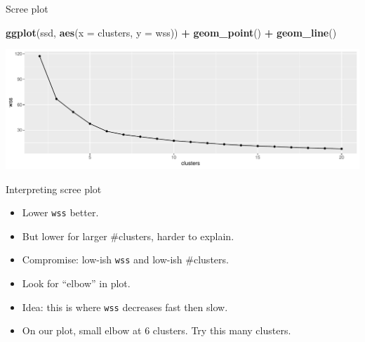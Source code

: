 \documentclass[
  ignorenonframetext,
]{beamer}
\newenvironment{Shaded}{\begin{snugshade}}{\end{snugshade}}
\newcommand{\DataTypeTok}[1]{\textcolor[rgb]{0.13,0.29,0.53}{#1}}
\newcommand{\KeywordTok}[1]{\textcolor[rgb]{0.13,0.29,0.53}{\textbf{#1}}}
\newcommand{\NormalTok}[1]{#1}
\newcommand{\OperatorTok}[1]{\textcolor[rgb]{0.81,0.36,0.00}{\textbf{#1}}}
\newcommand{\StringTok}[1]{\textcolor[rgb]{0.31,0.60,0.02}{#1}}
\begin{document}
\begin{frame}[fragile]{Scree plot}
\protect\hypertarget{scree-plot}{}

\begin{Shaded}
\begin{Highlighting}[]
\KeywordTok{ggplot}\NormalTok{(ssd, }\KeywordTok{aes}\NormalTok{(}\DataTypeTok{x =}\NormalTok{ clusters, }\DataTypeTok{y =}\NormalTok{ wss)) }\OperatorTok{+}\StringTok{ }\KeywordTok{geom_point}\NormalTok{() }\OperatorTok{+}
\StringTok{  }\KeywordTok{geom_line}\NormalTok{()}
\end{Highlighting}
\end{Shaded}

\includegraphics{slides_d29_files/figure-beamer/favalli-1.pdf}

\end{frame}

\begin{frame}[fragile]{Interpreting scree plot}
\protect\hypertarget{interpreting-scree-plot}{}

\begin{itemize}
\item
  Lower \texttt{wss} better.
\item
  But lower for larger \#clusters, harder to explain.
\item
  Compromise: low-ish \texttt{wss} and low-ish \#clusters.
\item
  Look for ``elbow'' in plot.
\item
  Idea: this is where \texttt{wss} decreases fast then slow.
\item
  On our plot, small elbow at 6 clusters. Try this many clusters.
\end{itemize}

\end{frame}
\end{document}
